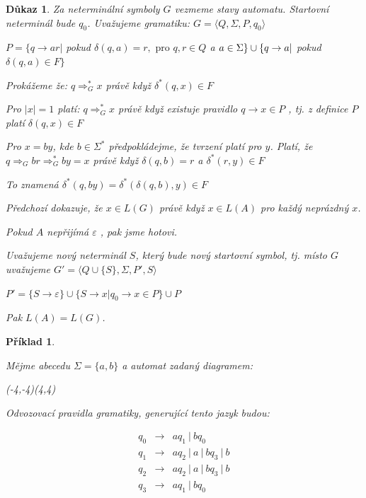 \documentclass[10pt, a4paper, titlepage]{article}
\theoremstyle{note}
\newtheorem{dukaz}{Důkaz}
\newtheorem{priklad}{Příklad}
\begin{document}
\begin{dukaz}
Za neterminální symboly $G$ vezmeme stavy automatu. Startovní neterminál bude $q_0$. Uvažujeme gramatiku:
$G = \langle Q,\Sigma,P,q_0 \rangle$

$P = \lbrace q \rightarrow ar |$ pokud $\delta (q,a)=r, \text{ pro } q,r \in Q$ a $a \in \Sigma \rbrace \\ \cup \lbrace q \rightarrow a |$ pokud $\delta (q,a) \in F \rbrace$ 

Prokážeme že: $ q \Rightarrow_G^* x $ právě když $ \delta^* (q,x) \in F$

Pro $|x|=1$ platí: $ q \Rightarrow_G^* x $ právě když existuje pravidlo $q \rightarrow x \in P$ , tj. z definice $P$ platí $\delta (q,x) \in F$

Pro $x=by$, kde $b \in \Sigma^*$ předpokládejme, že tvrzení platí pro $y$. Platí, že $q \Rightarrow_G br \Rightarrow_G^* by = x$ právě když $\delta (q,b)=r$ a $\delta^* (r,y) \in F$

To znamená $\delta^* (q,by) = \delta^* ( \delta (q,b),y) \in F$

Předchozí dokazuje, že $x \in L(G)$ právě když $x \in L(A)$ pro každý neprázdný $x$.

Pokud $A$ nepřijímá $\varepsilon$ , pak jsme hotovi.

Uvažujeme nový neterminál $S$, který bude nový startovní symbol, tj. místo $G$ uvažujeme $G'= \langle Q \cup \lbrace S \rbrace,\Sigma,P',S \rangle$

$P'= \lbrace S \rightarrow \varepsilon \rbrace \cup \lbrace S \rightarrow x | q_0 \rightarrow x \in P \rbrace \cup P$

Pak $L(A)=L(G)$.
\end{dukaz}

\begin{priklad}\label{priklad-4}

Mějme abecedu $\Sigma = \lbrace a,b \rbrace$ a automat zadaný diagramem:
\begin{center}
\begin{VCPicture}{(-4,-4)(4,4)}
\end{VCPicture}
\end{center}

Odvozovací pravidla gramatiky, generující tento jazyk budou:

\begin{eqnarray*}
q_0 &\rightarrow& aq_1\ |\ bq_0 \\
q_1 &\rightarrow& aq_2\ |\ a\ |\ bq_3\ |\  b \\
q_2 &\rightarrow& aq_2\ |\ a\ |\ bq_3\ |\  b \\
q_3 &\rightarrow& aq_1\ |\ bq_0
\end{eqnarray*}

\end{priklad}
\end{document}
